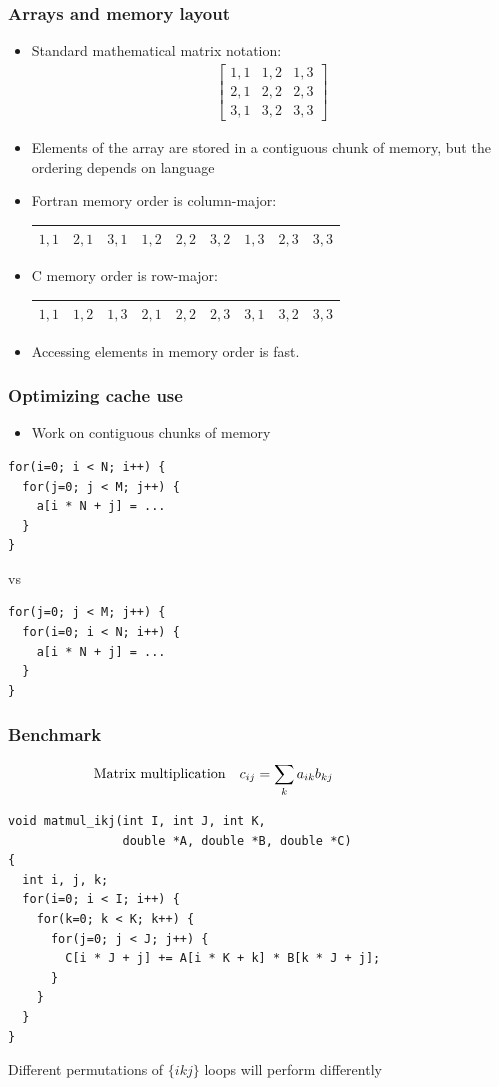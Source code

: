 \documentclass[usenames,dvipsnames,mathserif,compress]{beamer}
\begin{document}
\begin{frame}
  \frametitle{Arrays and memory layout}
  \begin{itemize}
  \item  Standard mathematical matrix notation:
  \begin{align}
    \left[
  \begin{matrix}
    1,1 & 1,2 & 1,3 \\
    2,1 & 2,2 & 2,3 \\
    3,1 & 3,2 & 3,3
  \end{matrix}
  \right]
  \end{align}
\item Elements of the array are stored in a \alert{contiguous} chunk of memory,
  but the ordering depends on language
\item Fortran memory order is \alert{column-major}:
  \begin{tabular}{|c|c|c|c|c|c|c|c|c|}
    \hline
     $1,1$&$2,1$&$3,1$&$1,2$&$2,2$&$3,2$&$1,3$&$2,3$&$3,3$ \\\hline
  \end{tabular}
\item C memory order is \alert{row-major}:
  \begin{tabular}{|c|c|c|c|c|c|c|c|c|}
    \hline
     $1,1$&$1,2$&$1,3$&$2,1$&$2,2$&$2,3$&$3,1$&$3,2$&$3,3$ \\\hline
  \end{tabular}
\item Accessing elements in memory order is fast.
  \end{itemize}
\end{frame}

\begin{frame}[fragile]
  \frametitle{Optimizing cache use}
  \begin{itemize}
  \item Work on contiguous chunks of memory
  \end{itemize}
\begin{lstlisting}
for(i=0; i < N; i++) {
  for(j=0; j < M; j++) {
    a[i * N + j] = ...
  }
}
\end{lstlisting}
vs
\begin{lstlisting}
for(j=0; j < M; j++) {
  for(i=0; i < N; i++) {
    a[i * N + j] = ...
  }
}
\end{lstlisting}
\end{frame}

\begin{frame}[fragile]
  \frametitle{Benchmark}
  \begin{align}
    \hspace{-2cm} \textrm{Matrix multiplication}\quad c_{ij} &= \sum_k a_{ik} b_{kj}\nonumber
  \end{align}
\begin{lstlisting}
void matmul_ikj(int I, int J, int K,
                double *A, double *B, double *C)
{
  int i, j, k;
  for(i=0; i < I; i++) {
    for(k=0; k < K; k++) {
      for(j=0; j < J; j++) {
        C[i * J + j] += A[i * K + k] * B[k * J + j];
      }
    }
  }
}
\end{lstlisting}
Different permutations of $\{ikj\}$ loops will perform differently
\end{frame}
\end{document}
